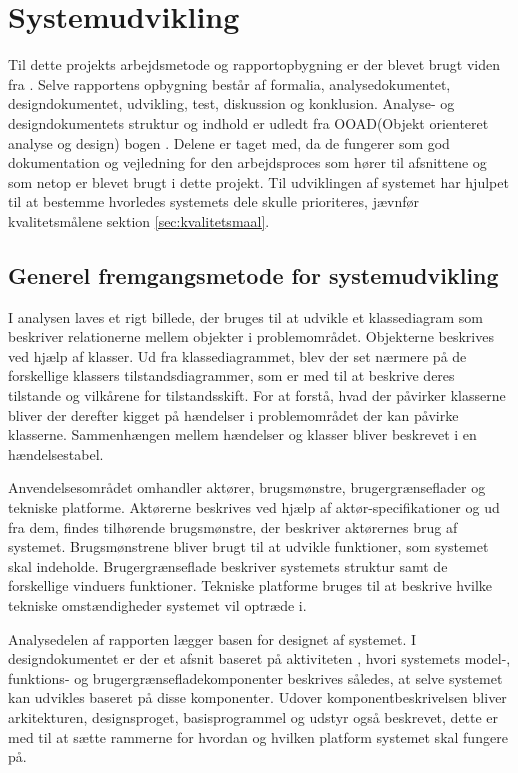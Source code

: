 \chapter{Systemudvikling}

Til dette projekts arbejdsmetode og rapportopbygning er der blevet brugt viden fra . Selve rapportens opbygning består af formalia, analysedokumentet, designdokumentet, udvikling, test, diskussion og konklusion. Analyse- og designdokumentets struktur og indhold er udledt fra OOAD(Objekt orienteret analyse og design) bogen \citep{ooaogd}. Delene er taget med, da de fungerer som god dokumentation og vejledning for den arbejdsproces som hører til afsnittene og som netop er blevet brugt i dette projekt. Til udviklingen af systemet har  hjulpet til at bestemme hvorledes systemets dele skulle prioriteres, jævnfør kvalitetsmålene sektion \ref{sec:kvalitetsmaal}.

\section{Generel fremgangsmetode for systemudvikling}
I analysen laves et rigt billede, der bruges til at udvikle et klassediagram som beskriver relationerne mellem objekter i problemområdet. Objekterne beskrives ved hjælp af klasser. Ud fra klassediagrammet, blev der set nærmere på de forskellige klassers tilstandsdiagrammer, som er med til at beskrive deres tilstande og vilkårene for tilstandsskift. For at forstå, hvad der påvirker klasserne bliver der derefter kigget på hændelser i problemområdet der kan påvirke klasserne. Sammenhængen mellem hændelser og klasser bliver beskrevet i en hændelsestabel.

Anvendelsesområdet omhandler aktører, brugsmønstre, brugergrænseflader og tekniske platforme. Aktørerne beskrives ved hjælp af aktør-specifikationer og ud fra dem, findes tilhørende brugsmønstre, der beskriver aktørernes brug af systemet. Brugsmønstrene bliver brugt til at udvikle funktioner, som systemet skal indeholde. Brugergrænseflade beskriver systemets struktur samt de forskellige vinduers funktioner. Tekniske platforme bruges til at beskrive hvilke tekniske omstændigheder systemet vil optræde i.

Analysedelen af rapporten lægger basen for designet af systemet. I designdokumentet er der et afsnit baseret på aktiviteten , hvori systemets model-, funktions- og brugergrænsefladekomponenter beskrives således, at selve systemet kan udvikles baseret på disse komponenter. Udover komponentbeskrivelsen bliver arkitekturen, designsproget, basisprogrammel og udstyr også beskrevet, dette er med til at sætte rammerne for hvordan og hvilken platform systemet skal fungere på.
 

